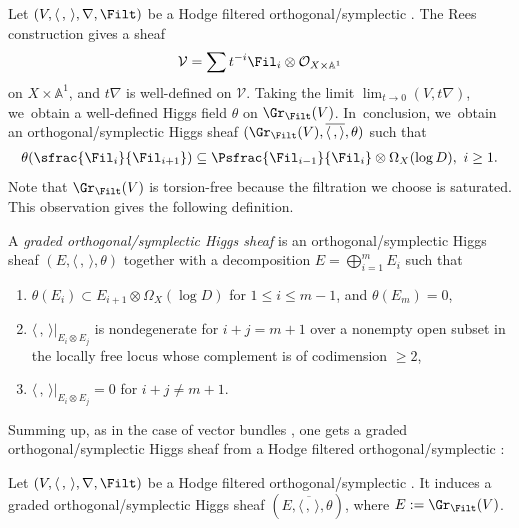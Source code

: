 Let $(V, \langle \,, \, \rangle,\nabla, \Filt)$ be a Hodge filtered orthogonal/symplectic \lconnection. The Rees construction gives a sheaf\vspace*{-3pt}
\begin{align*}
\mathcal{V}= \sum t^{-i} \Fil_{i} \otimes \mathcal{O}_{X \times \mathbb{A}^1}
\end{align*}
on $X \times \mathbb{A}^1$, and $t \nabla$ is well-defined on $\mathcal{V}$. Taking the limit $\lim_{t \to 0} (V,t\nabla)$, we~obtain a well-defined Higgs field $\theta$ on $\Gr_{\Filt}(V)$. In~conclusion, we~obtain an orthogonal/symplectic Higgs sheaf $(\Gr_{\Filt}(V), \overline{\langle \,, \rangle}, \theta)$ such that
\begin{align*}
\theta( \sfrac{\Fil_i}{\Fil_{i+1}} ) \subseteq \Psfrac{\Fil_{i-1}}{\Fil_{i}} \otimes \Omega_X(\log D), \ i \geq 1.
\end{align*}
Note that $\Gr_{\Filt}(V)$ is torsion-free because the filtration we choose is saturated. This observation gives the following definition.

\begin{defn}
A \emph{graded orthogonal/symplectic Higgs sheaf} is an orthogonal/symplectic Higgs sheaf $(E, \langle \,, \, \rangle,\theta)$ together with a decomposition $E=\mathop{\bigoplus}_{i=1}^{m} E_i$ such that
\begin{enumerate}
\item $\theta(E_i)\subset E_{i+1}\otimes \Omega_X(\log D)$ for $ 1\leq i\leq m-1$, and $\theta(E_m)=0$,

\item $\langle \,, \, \rangle|_{E_i\otimes E_j}$ is nondegenerate for $i+j=m+1$ over a nonempty open subset in the locally free locus whose complement is of codimension $\geq 2$,

\item $\langle \,, \, \rangle|_{E_i\otimes E_j}=0$ for $i+j\neq m+1$.
\end{enumerate}
\end{defn}

Summing up, as in the case of vector bundles \cite{S10}, one gets a graded orthogonal/symplectic Higgs sheaf from a Hodge filtered orthogonal/symplectic \lconnection:

\begin{lem}
Let $(V, \langle \,, \, \rangle,\nabla, \Filt)$ be a Hodge filtered orthogonal/symplectic \lconnection. It induces a graded orthogonal/symplectic Higgs sheaf $(E,\overline{\langle \,, \, \rangle},\theta)$, where $E:=\Gr_{\Filt}(V)$.
\end{lem}

